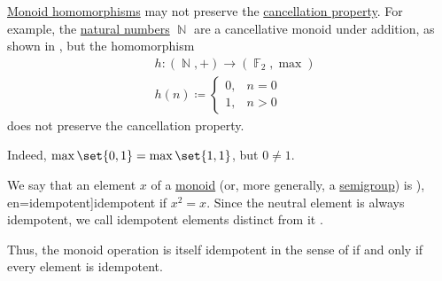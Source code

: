 \begin{example}\label{ex:monoid_cancellation_not_preserved_by_homomorphism}
  \hyperref[def:monoid/homomorphism]{Monoid homomorphisms} may not preserve the \hyperref[def:binary_operation/cancellative]{cancellation property}. For example, the \hyperref[def:natural_numbers]{natural numbers} \( \BbbN \) are a cancellative monoid under addition, as shown in , but the homomorphism
  \begin{equation*}
    \begin{aligned}
      &h: (\BbbN, +) \to (\BbbF_2, \max) \\
      &h(n) \coloneqq \begin{cases}
        0, &n = 0 \\
        1, &n > 0
      \end{cases}
    \end{aligned}
  \end{equation*}
  does not preserve the cancellation property.

  Indeed, \( \max\set{ 0, 1 } = \max\set{ 1, 1 } \), but \( 0 \neq 1 \).
\end{example}

\begin{definition}\label{def:monoid_idempotent}\cite[1]{Golan1999Semirings}
  We say that an element \( x \) of a \hyperref[def:monoid]{monoid} (or, more generally, a \hyperref[def:semigroup]{semigroup}) is \term[ru=идемпотент (\cite[72]{Ляпин1960Полугруппы}), en=idempotent]{idempotent} if \( x^2 = x \). Since the neutral element is always idempotent, we call idempotent elements distinct from it .
\end{definition}
\begin{comments}
  \item Thus, the monoid operation is itself idempotent in the sense of  if and only if every element is idempotent.
\end{comments}
